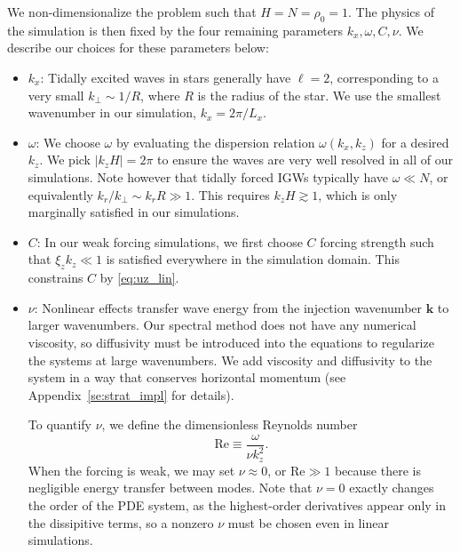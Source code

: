 \documentclass[
        fleqn,
        usenatbib,
        referee,
    ]{mnras}
\newcommand*{\abs}[1]{\left|#1\right|}
\newcommand*{\bm}[1]{\mathbf{#1}}
\begin{document}
We non-dimensionalize the problem such that $H = N = \rho_0 = 1$. The physics of
the simulation is then fixed by the four remaining parameters $k_{x}, \omega, C,
\nu$. We describe our choices for these parameters below:
\begin{itemize}
    \item $k_{x}$: Tidally excited waves in stars generally have $\ell = 2$,
        corresponding to a very small $k_\perp\sim 1/R$, where $R$ is the radius
        of the star. We use the smallest wavenumber in our simulation,
        $k_x=2\pi/L_x$.

    \item $\omega$: We choose $\omega$ by evaluating the dispersion relation
        $\omega(k_x, k_z)$ for a desired $k_z$. We pick $\abs{k_z H} = 2\pi$ to
        ensure the waves are very well resolved in all of our simulations. Note
        however that tidally forced IGWs typically have $\omega \ll N$, or
        equivalently $k_r/k_\perp \sim k_r R \gg 1$. This requires $k_z H
        \gtrsim 1$, which is only marginally satisfied in our simulations.

    \item $C$: In our weak forcing simulations, we first choose $C$ forcing
        strength such that $\xi_z k_z \ll 1$ is satisfied everywhere in the
        simulation domain. This constrains $C$ by \autoref{eq:uz_lin}.

    \item $\nu$: Nonlinear effects transfer wave energy from the injection
        wavenumber $\bm{k}$ to larger wavenumbers. Our spectral method does not
        have any numerical viscosity, so diffusivity must be introduced into the
        equations to regularize the systems at large wavenumbers. We add
        viscosity and diffusivity to the system in a way that conserves
        horizontal momentum (see Appendix~\ref{se:strat_impl} for details).

        To quantify $\nu$, we define the dimensionless Reynolds number
        \begin{equation}
            \mathrm{Re}  \equiv \frac{\omega}{\nu k_{z}^2}. \label{eq:re_def}
        \end{equation}
        When the forcing is weak, we may set $\nu \approx 0$, or $\mathrm{Re}
        \gg 1$ because there is negligible energy transfer between modes. Note
        that $\nu = 0$ exactly changes the order of the PDE system, as the
        highest-order derivatives appear only in the dissipitive terms, so a
        nonzero $\nu$ must be chosen even in linear simulations.
\end{itemize}
\end{document}
